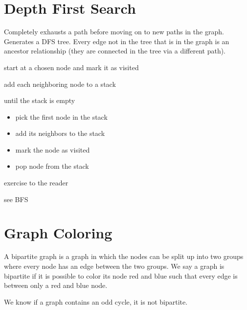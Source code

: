 \section{Depth First Search}
Completely exhausts a path before moving on to new paths in the graph. Generates a DFS tree. Every edge not in the tree that is in the graph is an ancestor relationship (they are connected in the tree via a different path).


\algorithm
{
    \item start at a chosen node and mark it as visited
    \item add each neighboring node to a stack 
    \item until the stack is empty
    \begin{itemize}
        \item pick the first node in the stack
        \item add its neighbors to the stack 
        \item mark the node as visited
        \item pop node from the stack
    \end{itemize}
}
{
    \item exercise to the reader
}
{
    \item see BFS
}

\section{Graph Coloring}
A bipartite graph is a graph in which the nodes can be split up into two groups where every node has an edge between the two groups. We say a graph is bipartite if it is possible to color its node red and blue such that every edge is between only a red and blue node.
 
We know if a graph contains an odd cycle, it is not bipartite.

